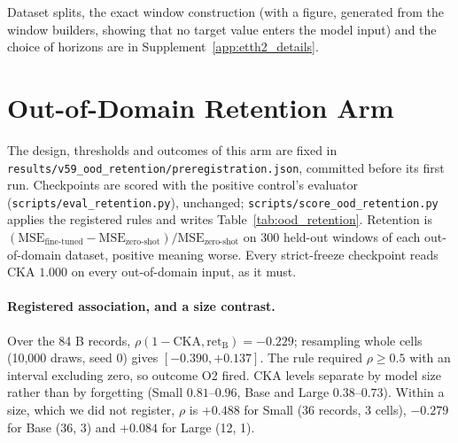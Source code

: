 Dataset splits, the exact window construction (with a figure, generated from the
window builders, showing that no target value enters the model input) and the
choice of horizons are in Supplement~\ref{app:etth2_details}.

\section{Out-of-Domain Retention Arm}
\label{app:ood}
The design, thresholds and outcomes of this arm are fixed in
\texttt{results/v59\_ood\_retention/preregistration.json}, committed before its
first run.  Checkpoints are scored with the positive control's evaluator
(\texttt{scripts/eval\_retention.py}), unchanged; \texttt{scripts/score\_ood\_retention.py}
applies the registered rules and writes Table~\ref{tab:ood_retention}.  Retention
is $(\text{MSE}_\text{fine-tuned}-\text{MSE}_\text{zero-shot})/\text{MSE}_\text{zero-shot}$
on 300 held-out windows of each out-of-domain dataset, positive meaning worse.
Every strict-freeze checkpoint reads CKA $1.000$ on every out-of-domain input, as
it must.

\begin{table}[!htbp]
\centering\scriptsize
\caption{Out-of-domain retention (\%, mean over seeds 42/123/456) under full
fine-tuning (B), the frozen encoder (D) and the strict freeze (H); B$-$H with its
two-sided 95\% $t$-interval; CKA of B on the out-of-domain inputs.  Rows marked
in \S\ref{sec:exp4:ood} as harmful are those with B$-$H${\geq}10$~pp in every seed.}
\label{tab:ood_retention}

\end{table}

\paragraph{Registered association, and a size contrast.}  Over the 84 B records,
$\rho(1{-}\text{CKA}, \text{ret}_\text{B}){=}{-}0.229$; resampling whole cells
(10{,}000 draws, seed 0) gives $[-0.390,{+}0.137]$.  The rule required
$\rho{\geq}0.5$ with an interval excluding zero, so outcome O2 fired.  CKA levels
separate by model size rather than by forgetting (Small $0.81$--$0.96$, Base and
Large $0.38$--$0.73$).  Within a size, which we did not register, $\rho$ is
${+}0.488$ for Small (36 records, 3 cells), ${-}0.279$ for Base (36, 3) and
${+}0.084$ for Large (12, 1).

